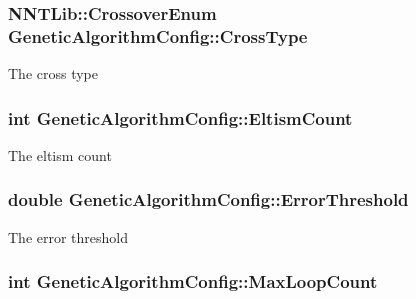 \subsubsection[{Cross\+Type}]{\setlength{\rightskip}{0pt plus 5cm}N\+N\+T\+Lib\+::\+Crossover\+Enum Genetic\+Algorithm\+Config\+::\+Cross\+Type}\label{class_genetic_algorithm_config_a3a812549ca573f20d6cafc3b651089ba}


The cross type 

\hypertarget{class_genetic_algorithm_config_a410b565ccd042a3eb5bcf914b7eba1c4}{}
\subsubsection[{Eltism\+Count}]{\setlength{\rightskip}{0pt plus 5cm}int Genetic\+Algorithm\+Config\+::\+Eltism\+Count}\label{class_genetic_algorithm_config_a410b565ccd042a3eb5bcf914b7eba1c4}


The eltism count 

\hypertarget{class_genetic_algorithm_config_ac4ebe8e0ea58e061871638a623ca016f}{}
\subsubsection[{Error\+Threshold}]{\setlength{\rightskip}{0pt plus 5cm}double Genetic\+Algorithm\+Config\+::\+Error\+Threshold}\label{class_genetic_algorithm_config_ac4ebe8e0ea58e061871638a623ca016f}


The error threshold 

\hypertarget{class_genetic_algorithm_config_ae792cdb8d57ceef9a637ac3692e44fa9}{}
\subsubsection[{Max\+Loop\+Count}]{\setlength{\rightskip}{0pt plus 5cm}int Genetic\+Algorithm\+Config\+::\+Max\+Loop\+Count}\label{class_genetic_algorithm_config_ae792cdb8d57ceef9a637ac3692e44fa9}


